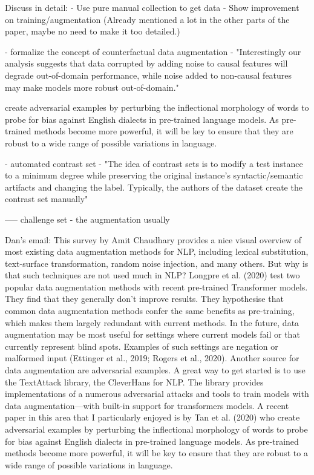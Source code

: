 Discuss in detail:
\citet{gardner2020contrast}
\citet{kaushik2019learning}
- Use pure manual collection to get data
- Show improvement on training/augmentation
(Already mentioned a lot in the other parts of the paper, maybe no need to make it too detailed.)

\citet{kaushik2020explaining}
- formalize the concept of counterfactual data augmentation
- "Interestingly our analysis suggests that data corrupted by adding noise to causal features will degrade out-of-domain performance, while noise added to non-causal features may make models more robust out-of-domain."

\citet{tan2020s}
create adversarial examples by perturbing the inflectional morphology of words to probe for bias against English dialects in pre-trained language models. As pre-trained methods become more powerful, it will be key to ensure that they are robust to a wide range of possible variations in language.

\citet{li2020linguistically}
- automated contrast set 
- "The idea of contrast sets is to modify a test instance to a minimum degree while preserving the original instance’s syntactic/semantic artifacts and changing the label. Typically, the authors of the dataset create the contrast set manually"

----- challenge set
- the augmentation usually 


Dan's email:
This survey by Amit Chaudhary provides a nice visual overview of most existing data augmentation methods for NLP, including lexical substitution, text-surface transformation, random noise injection, and many others. But why is that such techniques are not used much in NLP? Longpre et al. (2020) test two popular data augmentation methods with recent pre-trained Transformer models. They find that they generally don’t improve results. They hypothesise that common data augmentation methods confer the same benefits as pre-training, which makes them largely redundant with current methods. In the future, data augmentation may be most useful for settings where current models fail or that currently represent blind spots. Examples of such settings are negation or malformed input (Ettinger et al., 2019; Rogers et al., 2020).
Another source for data augmentation are adversarial examples. A great way to get started is to use the TextAttack library, the CleverHans for NLP. The library provides implementations of a numerous adversarial attacks and tools to train models with data augmentation—with built-in support for transformers models. A recent paper in this area that I particularly enjoyed is by Tan et al. (2020) who create adversarial examples by perturbing the inflectional morphology of words to probe for bias against English dialects in pre-trained language models. As pre-trained methods become more powerful, it will be key to ensure that they are robust to a wide range of possible variations in language.

